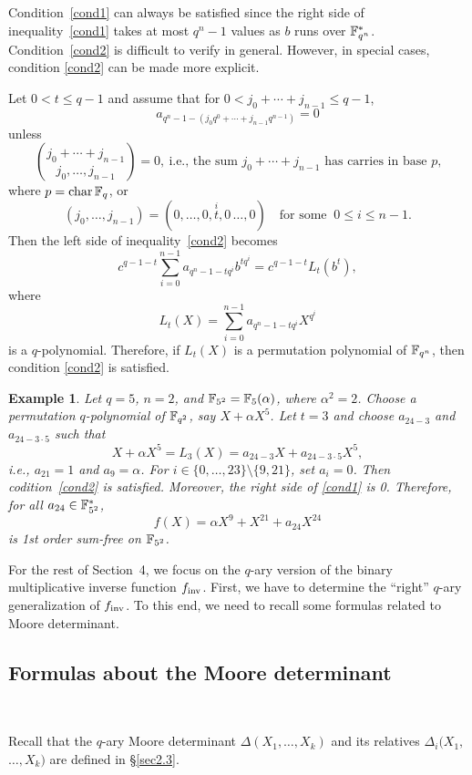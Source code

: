\documentclass{amsart}
\newtheorem{exmp}[thm]{Example}
\numberwithin{equation}{section}
\theoremstyle{definition}
\newcommand{\f}{\Bbb F}
\newcommand{\fin}{f_{\text{\rm inv}}}
\begin{document}
Condition~\eqref{cond1} can always be satisfied since the right side of inequality~\eqref{cond1} takes at most $q^n-1$ values as $b$ runs over $\f_{q^n}^*$. Condition~\eqref{cond2} is difficult to verify in general. However, in special cases, condition \eqref{cond2} can be made more explicit. 

Let $0<t\le q-1$ and assume that for $0<j_0+\cdots+j_{n-1}\le q-1$, 
\[
a_{q^n-1-(j_0q^0+\cdots+j_{n-1}q^{n-1})}=0
\]
unless
\[
\binom{j_0+\cdots+j_{n-1}}{j_0,\dots,j_{n-1}}=0,\ \text{i.e., the sum $j_0+\cdots+j_{n-1}$ has carries in base $p$,}
\]
where $p=\text{char}\,\f_q$, or 
\[
(j_0,\dots,j_{n-1})=(0,\dots,0,\overset it,0\,\dots,0)\quad\text{for some }\ 0\le i\le n-1.
\]
Then the left side of inequality~\eqref{cond2} becomes
\[
c^{q-1-t}\sum_{i=0}^{n-1}a_{q^n-1-tq^i}b^{tq^i}=c^{q-1-t}L_t(b^t),
\]
where 
\[
L_t(X)=\sum_{i=0}^{n-1}a_{q^n-1-tq^i}X^{q^i}
\]
is a $q$-polynomial. Therefore, if $L_t(X)$ is a permutation polynomial of $\f_{q^n}$, then condition \eqref{cond2} is satisfied.

\begin{exmp}\label{E4.4}\rm
Let $q=5$, $n=2$, and $\f_{5^2}=\f_5(\alpha)$, where $\alpha^2=2$. Choose a permutation $q$-polynomial of $\f_{q^2}$, say $X+\alpha X^5$. Let $t=3$ and choose $a_{24-3}$ and $a_{24-3\cdot 5}$ such that 
\[
X+\alpha X^5=L_3(X)=a_{24-3}X+a_{24-3\cdot 5}X^5,
\]
i.e., $a_{21}=1$ and $a_9=\alpha$. For $i\in\{0,\dots,23\}\setminus\{9,21\}$, set $a_i=0$. Then codition~\eqref{cond2} is satisfied. Moreover, the right side of \eqref{cond1} is 0. Therefore, for all $a_{24}\in\f_{5^2}^*$,
\[
f(X)=\alpha X^9+X^{21}+a_{24}X^{24}
\]
is 1st order sum-free on $\f_{5^2}$.
\end{exmp}
 




For the rest of Section~4, we focus on the $q$-ary version of the binary multiplicative inverse function $\fin$. First, we have to determine the ``right'' $q$-ary generalization of $\fin$. To this end, we need to recall some formulas related to Moore determinant.

\subsection{Formulas about the Moore determinant}\

Recall that the $q$-ary Moore determinant $\Delta(X_1,\dots,X_k)$ and its relatives $\Delta_i(X_1,$ $\dots,X_k)$ are defined in \S\ref{sec2.3}.
\end{document}
